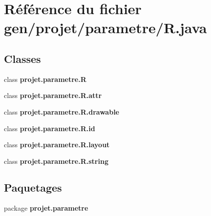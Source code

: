 \section{\-Référence du fichier gen/projet/parametre/\-R.java}
\label{_r_8java}
\subsection*{\-Classes}
\begin{DoxyCompactItemize}
\item 
class {\bf projet.\-parametre.\-R}
\item 
class {\bf projet.\-parametre.\-R.\-attr}
\item 
class {\bf projet.\-parametre.\-R.\-drawable}
\item 
class {\bf projet.\-parametre.\-R.\-id}
\item 
class {\bf projet.\-parametre.\-R.\-layout}
\item 
class {\bf projet.\-parametre.\-R.\-string}
\end{DoxyCompactItemize}
\subsection*{\-Paquetages}
\begin{DoxyCompactItemize}
\item 
package {\bf projet.\-parametre}
\end{DoxyCompactItemize}
